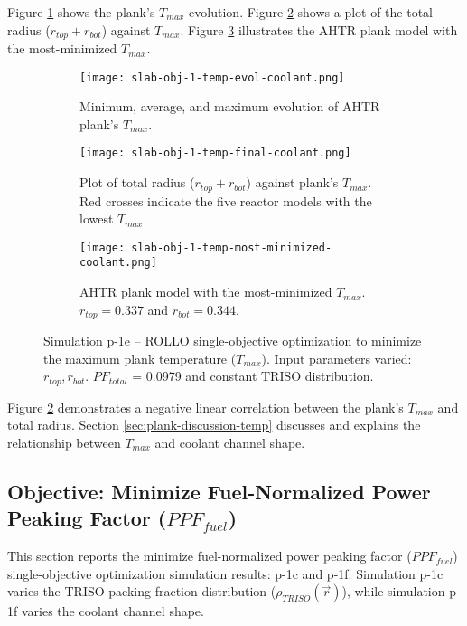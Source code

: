 Figure \ref{fig:slab-obj-1-temp-evol-coolant} shows the plank's $T_{max}$ evolution.
Figure \ref{fig:slab-obj-1-temp-final-coolant} shows a plot of the total radius 
($r_{top} + r_{bot}$) against $T_{max}$.
Figure \ref{fig:slab-obj-1-temp-most-minimized-coolant} illustrates the \gls{AHTR} 
plank model with the most-minimized $T_{max}$. 
\begin{figure}[htbp!]
    \centering
    \begin{subfigure}{\textwidth}
        \texttt{[image: slab-obj-1-temp-evol-coolant.png]}
        \caption{Minimum, average, and maximum evolution of AHTR plank's $T_{max}$.}
        \label{fig:slab-obj-1-temp-evol-coolant} 
    \end{subfigure}
    \begin{subfigure}{\textwidth}
        \texttt{[image: slab-obj-1-temp-final-coolant.png]}
        \caption{Plot of total radius ($r_{top} + r_{bot}$) against plank's 
        $T_{max}$. Red crosses indicate the five reactor models with the 
        lowest $T_{max}$.}
        \label{fig:slab-obj-1-temp-final-coolant} 
    \end{subfigure}
    \begin{subfigure}{\textwidth}
        \texttt{[image: slab-obj-1-temp-most-minimized-coolant.png]}
        \caption{\gls{AHTR} plank model with the most-minimized $T_{max}$. 
        $r_{top} = 0.337$ and $r_{bot} = 0.344$.}
        \label{fig:slab-obj-1-temp-most-minimized-coolant} 
    \end{subfigure}
    \caption{Simulation p-1e -- ROLLO single-objective optimization to minimize 
    the maximum plank temperature ($T_{max}$). 
    Input parameters varied: $r_{top}, r_{bot}$. $PF_{total}$ = 0.0979 and constant 
    TRISO distribution.}
    \label{fig:slab-obj-1-temp-coolant}
\end{figure}

Figure \ref{fig:slab-obj-1-temp-final-coolant} demonstrates a negative 
linear correlation between the plank's $T_{max}$ and total radius. 
Section \ref{sec:plank-discussion-temp} discusses and explains the relationship between 
$T_{max}$ and coolant channel shape. 

\subsection{Objective: Minimize Fuel-Normalized Power Peaking Factor ($PPF_{fuel}$)}
\label{sec:plank-1-obj-ppf}
This section reports the minimize fuel-normalized power peaking factor 
($PPF_{fuel}$) single-objective optimization simulation results: p-1c and p-1f. 
Simulation p-1c varies the \gls{TRISO} packing fraction distribution 
($\rho_{TRISO}(\vec{r})$), while simulation p-1f varies the coolant channel shape. 

